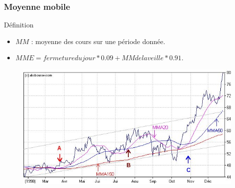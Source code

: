 \begin{frame}
    \frametitle{Moyenne mobile}
      	\begin{block}{Définition}
  		\begin{itemize}
  			\item $MM$ : moyenne des cours sur une période donnée.
   			\item $MME = fermeture du jour * 0.09 + MM de la veille * 0.91$. 
		\end{itemize}
	\end{block}
	\begin{figure}
	    \includegraphics[scale=0.3]{images/moyennemobile.png}   
	\end{figure}
\end{frame}


